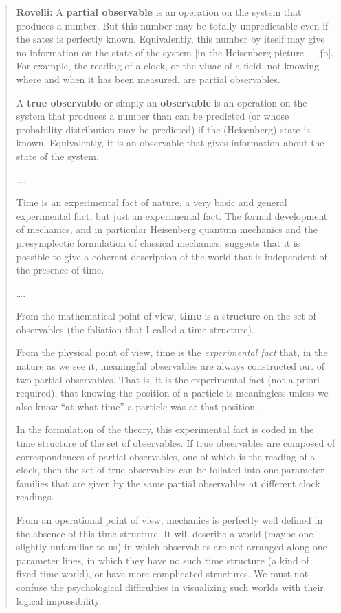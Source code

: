 \documentclass[12pt]{article}
\begin{document}
\begin{quote}
\textbf{Rovelli:} A \textbf{partial observable} is an operation on the
system that produces a number. But this number may be totally
unpredictable even if the sates is perfectly known. Equivalently, this
number by itself may give no information on the state of the system
{[}in the Heisenberg picture --- jb{]}. For example, the reading of a
clock, or the vluae of a field, not knowing where and when it has been
measured, are partial observables.

A \textbf{true observable} or simply an \textbf{observable} is an
operation on the system that produces a number than can be predicted (or
whose probability distribution may be predicted) if the (Heisenberg)
state is known. Equivalently, it is an observable that gives information
about the state of the system.

\ldots.

Time is an experimental fact of nature, a very basic and general
experimental fact, but just an experimental fact. The formal development
of mechanics, and in particular Heisenberg quantum mechanics and the
presymplectic formulation of classical mechanics, suggests that it is
possible to give a coherent description of the world that is independent
of the presence of time.

\ldots.

From the mathematical point of view, \textbf{time} is a structure on the
set of observables (the foliation that I called a time structure).

From the physical point of view, time is the \emph{experimental fact}
that, in the nature as we see it, meaningful observables are always
constructed out of two partial observables. That is, it is the
experimental fact (not a priori required), that knowing the position of
a particle is meaningless unless we also know ``at what time'' a
particle was at that position.

In the formulation of the theory, this experimental fact is coded in the
time structure of the set of observables. If true observables are
composed of correspondences of partial observables, one of which is the
reading of a clock, then the set of true observables can be foliated
into one-parameter families that are given by the same partial
observables at different clock readings.

From an operational point of view, mechanics is perfectly well defined
in the absence of this time structure. It will describe a world (maybe
one slightly unfamiliar to us) in which observables are not arranged
along one-parameter lines, in which they have no such time structure (a
kind of fixed-time world), or have more complicated structures. We must
not confuse the psychological difficulties in visualizing such worlds
with their logical impossibility.


\end{quote}
\end{document}
